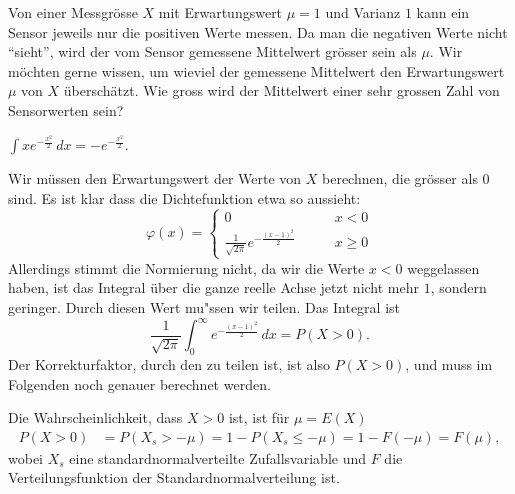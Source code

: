 Von einer Messgrösse $X$ mit Erwartungswert $\mu=1$ und Varianz $1$
kann ein Sensor jeweils nur die positiven Werte messen.
Da man die negativen Werte nicht ``sieht'', wird der vom Sensor gemessene
Mittelwert grösser sein als $\mu$.
Wir möchten gerne wissen, um wieviel der gemessene Mittelwert den Erwartungswert
$\mu$ von $X$ überschätzt.
Wie gross wird der Mittelwert einer sehr grossen Zahl von Sensorwerten sein?

\begin{hinweis}
$\int xe^{-\frac{x^2}2}\,dx = -e^{-\frac{x^2}2}.$
\end{hinweis}


\begin{loesung}
Wir müssen den Erwartungswert der Werte von $X$ berechnen, die grösser
als $0$ sind. Es ist klar dass die Dichtefunktion etwa so aussieht:
\[
\varphi(x)=\begin{cases}
0&\qquad x<0\\
\frac1{\sqrt{2\pi}}e^{-\frac{(x-1)^2}2}&\qquad x\ge 0
\end{cases}
\]
Allerdings stimmt die Normierung nicht, da wir die Werte $x < 0$ weggelassen
haben, ist das Integral über die ganze reelle Achse jetzt nicht mehr $1$,
sondern geringer. Durch diesen Wert mu"ssen wir teilen. Das Integral ist
\[
\frac1{\sqrt{2\pi}}
\int_{0}^\infty
e^{-\frac{(x-1)^2}2}\,dx=
P(X > 0).
\]
Der Korrekturfaktor, durch den zu teilen ist, ist also $P(X>0)$, und muss im
Folgenden noch genauer berechnet werden.

Die Wahrscheinlichkeit, dass $X>0$ ist, ist für $\mu=E(X)$
\begin{align*}
P(X>0)&=P(X_s > -\mu)=1-P(X_s\le-\mu)=1-F(-\mu)=F(\mu),
\end{align*}
wobei $X_s$ eine standardnormalverteilte Zufallsvariable und $F$ die
Verteilungsfunktion der Standardnormalverteilung ist.


\end{loesung}
